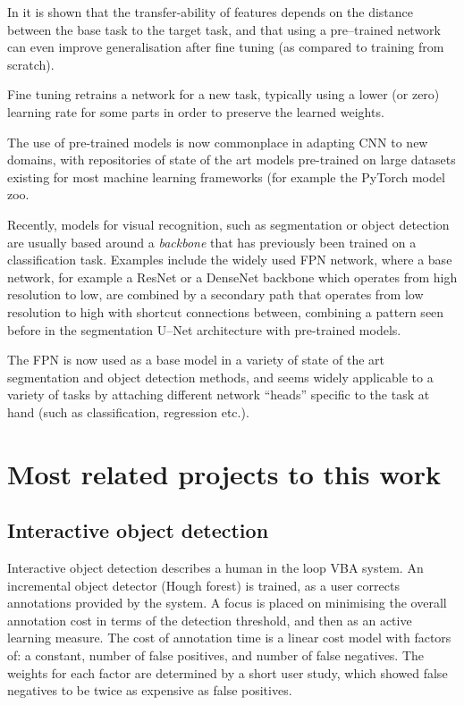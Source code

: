 In \cite{Yosinski} it is shown that the transfer-ability of features depends on the distance between the base task to the target task, and that using a pre--trained network can even improve generalisation after fine tuning (as compared to training from scratch).

Fine tuning retrains a network for a new task, typically using a lower (or zero) learning rate for some parts in order to preserve the learned weights. 

The use of pre-trained models is now commonplace in adapting \gls{CNN} to new domains, with repositories of state of the art models pre-trained on large datasets existing for most machine learning frameworks (for example the PyTorch \cite{Paszke2017} model zoo. 

Recently, models for visual recognition, such as segmentation or object detection are usually based around a \emph{backbone} that has previously been trained on a classification task. Examples include the widely used \gls{FPN} network, \cite{Lin2017a} where a base network, for example a ResNet \cite{He} or a DenseNet \cite{Huang2016} backbone which operates from high resolution to low, are combined by a secondary path that operates from low resolution to high with shortcut connections between, combining a pattern seen before in the segmentation U--Net \cite{Ronneberger2015} architecture with pre-trained models.

The \gls{FPN} is now used as a base model in a variety of state of the art segmentation and object detection methods, and seems widely applicable to a variety of tasks by attaching different network ``heads'' specific to the task at hand (such as classification, regression etc.).




\section {Most related projects to this work}
\label{sec:closest}

\subsection {Interactive object detection \cite{Yao2012}}

Interactive object detection \cite{Yao2012} describes a human in the loop \gls{VBA} system. An incremental object detector (Hough forest) is trained, as a user corrects annotations provided by the system. A focus is placed on minimising the overall annotation cost in terms of the detection threshold, and then as an active learning measure. 
The cost of annotation time is a linear cost model with factors of: a constant, number of false positives, and number of false negatives. The weights for each factor are determined by a short user study, which showed false negatives to be twice as expensive as false positives. 

